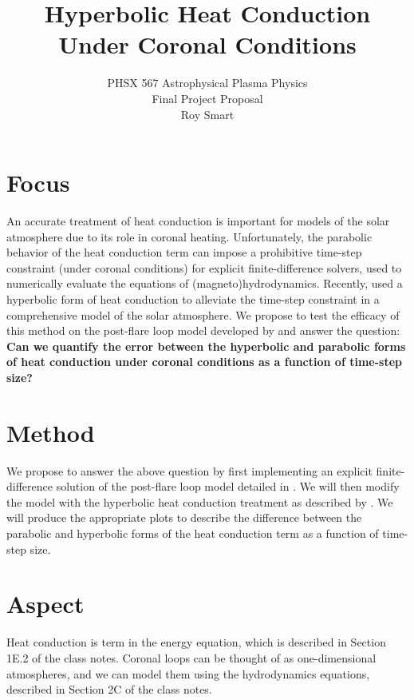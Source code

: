 \documentclass[10pt,letterpaper]{article}
\title{Hyperbolic Heat Conduction Under Coronal Conditions }
\author{PHSX 567 Astrophysical Plasma Physics \\ Final Project Proposal \\  Roy Smart}
\begin{document}
	
	\maketitle
	
	\section{Focus}
	
	An accurate treatment of heat conduction is important for models of the solar atmosphere due to its role in coronal heating. Unfortunately, the parabolic behavior of the heat conduction term can impose a prohibitive time-step constraint (under coronal conditions) for explicit finite-difference solvers, used to numerically evaluate the equations of (magneto)hydrodynamics. Recently, \cite{2017ApJ...834...10R} used a hyperbolic form of heat conduction to alleviate the time-step constraint in a comprehensive model of the solar atmosphere. We propose to test the efficacy of this method on the post-flare loop model developed by \cite{2014ApJ...795...10L} and answer the question: \textbf{Can we quantify the error between the hyperbolic and parabolic forms of heat conduction under coronal conditions as a function of time-step size?}
	
	\section{Method}
	
	We propose to answer the above question by first implementing an explicit finite-difference solution of the post-flare loop model detailed in \cite{2014ApJ...795...10L}. We will then modify the \cite{2014ApJ...795...10L} model with the hyperbolic heat conduction treatment as described by \cite{2017ApJ...834...10R}. We will produce the appropriate plots to describe the difference between the parabolic and hyperbolic forms of the heat conduction term as a function of time-step size.
	
	\section{Aspect} 
	
	Heat conduction is term in the energy equation, which is described in Section 1E.2 of the class notes. Coronal loops can be thought of as one-dimensional atmospheres, and we can model them using the hydrodynamics equations, described in Section 2C of the class notes.
	
	\printbibliography
	
\end{document}
